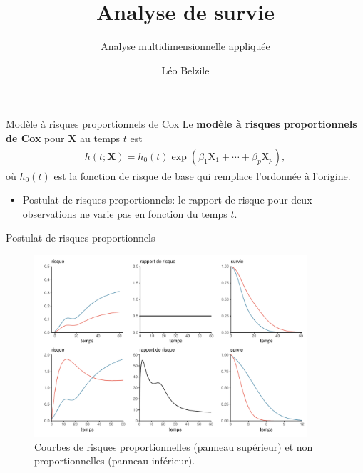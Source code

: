 \documentclass[
  ignorenonframetext,
]{beamer}
\title{Analyse de survie}
\subtitle{Analyse multidimensionnelle appliquée}
\author{Léo Belzile}
\date{}
\institute{HEC Montréal}
\providecommand{\tightlist}{%
  \setlength{\itemsep}{0pt}\setlength{\parskip}{0pt}}\usepackage{longtable,booktabs,array}
\begin{document}
\frame{\titlepage}
\ifdefined\Shaded\renewenvironment{Shaded}{\begin{tcolorbox}[interior hidden, frame hidden, borderline west={3pt}{0pt}{shadecolor}, enhanced, breakable, sharp corners, boxrule=0pt]}{\end{tcolorbox}}\fi

\begin{frame}{Modèle à risques proportionnels de Cox}
\protect\hypertarget{moduxe8le-uxe0-risques-proportionnels-de-cox}{}
Le \textbf{modèle à risques proportionnels de Cox} pour \(\mathbf{X}\)
au temps \(t\) est \begin{align*}
h(t; \mathbf{X}) = h_0(t)\exp(\beta_1\mathrm{X}_1 + \cdots + \beta_p \mathrm{X}_p),
\end{align*} où \(h_0(t)\) est la fonction de risque de base qui
remplace l'ordonnée à l'origine.

\begin{itemize}
\tightlist
\item
  Postulat de risques proportionnels: le rapport de risque pour deux
  observations ne varie pas en fonction du temps \(t\).
\end{itemize}
\end{frame}

\begin{frame}{Postulat de risques proportionnels}
\protect\hypertarget{postulat-de-risques-proportionnels}{}
\begin{figure}

{\centering \includegraphics[width=0.9\textwidth,height=\textheight]{MATH60602-diapos9_files/figure-beamer/fig-risquepropfig-1.pdf}

}

\caption{\label{fig-risquepropfig}Courbes de risques proportionnelles
(panneau supérieur) et non proportionnelles (panneau inférieur).}

\end{figure}
\end{frame}
\end{document}
